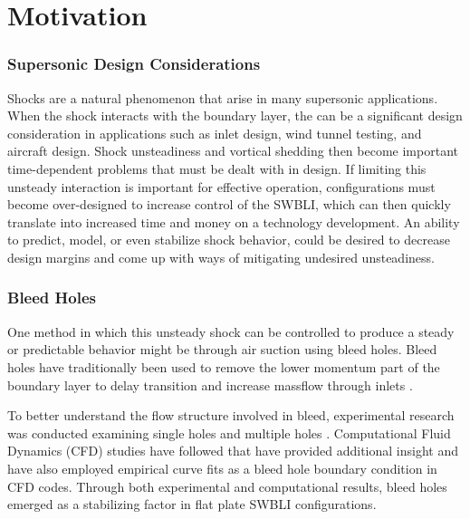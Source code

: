 \section{Motivation}

\subsubsection{Supersonic Design Considerations}

Shocks are a natural phenomenon that arise in many supersonic applications. When the shock interacts with the boundary layer, the  can be a significant design consideration in applications such as inlet design, wind tunnel testing, and aircraft design. Shock unsteadiness and vortical shedding then become important time-dependent problems that must be dealt with in design. If limiting this unsteady interaction is important for effective operation, configurations must become over-designed to increase control of the SWBLI, which can then quickly translate into increased time and money on a technology development. An ability to predict, model, or even stabilize shock behavior, could be desired to decrease design margins and come up with ways of mitigating undesired unsteadiness. 

\subsubsection{Bleed Holes}

One method in which this unsteady shock can be controlled to produce a steady or predictable behavior might be through air suction using bleed holes. Bleed holes have traditionally been used to remove the lower momentum part of the boundary layer to delay transition and increase massflow through inlets \cite{Davis2012Fibe}. 



To better understand the flow structure involved in bleed, experimental research was conducted examining single holes \cite{Schoenenberger1999, Davis2012, Eichorn2013, Orkwis2013} and multiple holes \cite{Syberg1973, Paynter1993, Willis1995, Oorebeek2012}. Computational Fluid Dynamics (CFD) studies have followed \cite{Hamed2008, Choe2016, Duncan2016} that have provided additional insight and have also employed empirical curve fits as a bleed hole boundary condition \cite{Harloff1996, Baurle2011, Slater2012} in CFD codes. Through both experimental and computational results, bleed holes emerged as a stabilizing factor in flat plate SWBLI configurations\cite{Hamed1995}.

